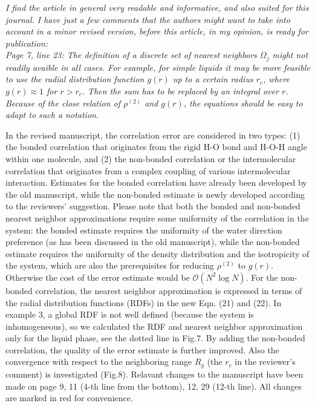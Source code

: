 \documentclass[a4paper]{article}
\begin{document}
\textit{
  I find the article in general very readable and informative, and
  also suited for this journal. I have just a few comments that the
  authors might want to take into account in a minor revised version,
  before this article, in my opinion, is ready for publication:
}\\

\textit{ Page 7, line 23: The definition of a discrete set of nearest
  neighbors $\Omega_j$ might not readily avaible in all cases. For
  example, for simple liquids it may be more feasible to use the
  radial distribution function $g(r)$ up to a certain radius $r_c$,
  where $g(r) \approx 1$ for $r > r_c$. Then the sum has to be
  replaced by an integral over $r$.  Because of the close relation of
  $\rho^{(2)}$ and $g(r)$, the equations should be easy to adapt to
  such a notation.  }

In the revised manuscript, the correlation error are considered
in two types: 
(1) the bonded correlation
that originates from the rigid H-O
bond and H-O-H angle within one molecule,
and (2) the
non-bonded correlation or the
intermolecular correlation that originates from
a complex coupling of various intermolecular interaction.
Estimates for the bonded correlation
have already been developed by the old manuscript,
while the non-bonded estimate
is newly developed according to the reviewers' suggestion.
Please note that
both the bonded and non-bonded nearest neighbor approximations
require some uniformity of the correlation in the system:
the bonded estimate requires the uniformity of the water
direction preference (as has been discussed in the old manuscript),
while the non-bonded estimate requires the uniformity
of the density distribution and the isotropicity of the system, which
are also the prerequisites for reducing $\rho^{(2)}$ to $g(r)$.
Otherwise the cost of the error estimate would be $\mathcal O(N^2\log N)$.
For the non-bonded correlation,  the nearest neighbor approximation 
is expressed in terms of the radial distribution
functions (RDFs) in the new Eqn. (21) and (22).
In example 3, a global RDF is not well defined
(because the system is inhomogeneous),
so we calculated the RDF and nearest neighbor approximation
only for the liquid phase, see the dotted line in Fig.7. By adding the
non-bonded correlation, the quality of the error estimate
is further improved.
Also the convergence with respect to
the neighboring range $R_g$ (the $r_c$ in the reviewer's comment)
is investigated (Fig.8). 
Relavant changes to the manuscript
have been made on page 9,
11 (4-th line from the bottom), 12, 29 (12-th line). All changes are marked 
in red for convenience.
\\
\end{document}
